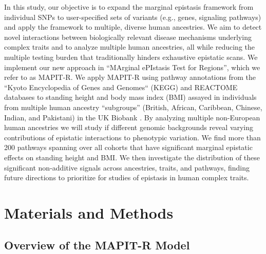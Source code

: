 \documentclass[10pt]{article}
\begin{document}
In this study, our objective is to expand the marginal epistasis framework from individual SNPs to user-specified sets of variants (e.g., genes, signaling pathways) and apply the framework to multiple, diverse human ancestries. We aim to detect novel interactions between biologically relevant disease mechanisms underlying complex traits and to analyze multiple human ancestries, all while reducing the multiple testing burden that traditionally hinders exhaustive epistatic scans. We implement our new approach in ``MArginal ePIstasis Test for Regions'', which we refer to as MAPIT-R. We apply MAPIT-R using pathway annotations from the ``Kyoto Encyclopedia of Genes and Genomes`` (KEGG) and REACTOME databases \cite{Liberzon2011} to standing height and body mass index (BMI) assayed in individuals from multiple human ancestry ``subgroups'' (British, African, Caribbean, Chinese, Indian, and Pakistani) in the UK Biobank \cite{Sudlow2015}. By analyzing multiple non-European human ancestries we will study if different genomic backgrounds reveal varying contributions of epistatic interactions to phenotypic variation. We find more than 200 pathways spanning over all cohorts that have significant marginal epistatic effects on standing height and BMI. We then investigate the distribution of these significant non-additive signals across ancestries, traits, and pathways, finding future directions to prioritize for studies of epistasis in human complex traits.


\section*{Materials and Methods} 

\subsection*{Overview of the MAPIT-R Model}
\end{document}
